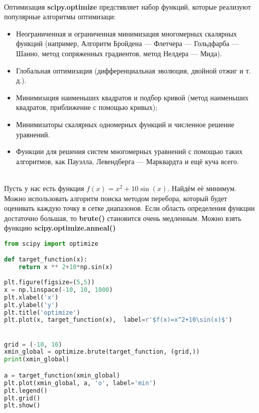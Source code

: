 \documentclass{article}
\begin{document}
\\
\begin{section}{Оптимизация}
\textbf{scipy.optimize} предстявляет набор функций, которые реализуют популярные алгоритмы оптимизаци: 
\begin{itemize}
    \item Неограниченная и ограниченная минимизация многомерных скалярных функций (например, Алгоритм Бройдена — Флетчера — Гольдфарба — Шанно, метод сопряженных градиентов, метод Нелдера — Мида).
    \item Глобальная оптимизация (дифференциальная эволюция, двойной отжиг и т. д.).
    \item Минимизация наименьших квадратов и подбор кривой (метод наименьших квадратов, приближение с помощью кривых);
    \item Минимизаторы скалярных одномерных функций и численное решение уравнений.
    \item Функции для решения систем многомерных уравнений с помощью таких алгоритмов, как Пауэлла, Левендберга — Марквардта и ещё куча всего.
\end{itemize}
\\
Пусть у нас есть функция $f(x)=x^2+10\sin(x)$. Найдём её минимум. Можно использовать алгоритм поиска методом перебора, который будет оценивать каждую точку в сетке диапазонов. Если область определения функции достаточно большая, то \textbf{brute()} становится очень медленным. Можно взять функцию \textbf{scipy.optimize.anneal()}
\\
\begin{lstlisting}[language=Python]
from scipy import optimize

def target_function(x):
    return x ** 2+10*np.sin(x)
 
plt.figure(figsize=(5,5))
x = np.linspace(-10, 10, 1000)
plt.xlabel('x')
plt.ylabel('y')
plt.title('optimize')
plt.plot(x, target_function(x),  label=r'$f(x)=x^2+10\sin(x)$')


grid = (-10, 10)
xmin_global = optimize.brute(target_function, (grid,))
print(xmin_global)

a = target_function(xmin_global)
plt.plot(xmin_global, a, 'o', label='min')
plt.legend()
plt.grid()
plt.show()


\end{lstlisting}
\end{section}
\end{document}
